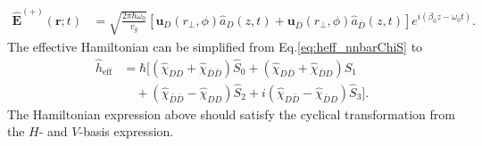 \documentclass[preprint,aps,pra,onecolumn,superscriptaddress]{revtex4-1} %
\def\br{\mathbf{r}}
\newcommand{\nn}{\nonumber}
\newcommand{\eff}{\text{eff}}
\begin{document}
\begin{appendix}
\begin{align}
\hat{\mathbf{E}}^{(+)}(\br;t) &=\sqrt{ \frac{2 \pi \hbar \omega_0}{ v_g} } \left[\mathbf{u}_D(r\!_\perp,\phi) \hat{a}_D(z,t)+\mathbf{u}_{\bar{D}}(r\!_\perp,\phi) \hat{a}_{\bar{D}}(z,t)  \right]e^{i (\beta_0 z- \omega_0 t)}.
\end{align}
The effective Hamiltonian can be simplified from Eq.\eqref{eq:heff_nnbarChiS} to 
\begin{align}
\hat{h}_\eff &= \hbar[(\hat{\chi}_{DD}+\hat{\chi}_{\bar{D}\bar{D}})\hat{S}_0 +(\hat{\chi}_{D\bar{D}}+\hat{\chi}_{\bar{D}D} )\hat{S}_1\nn\\
&\quad + (\hat{\chi}_{\bar{D}\bar{D}}-\hat{\chi}_{DD})\hat{S}_2 +i(\hat{\chi}_{D\bar{D}}-\hat{\chi}_{\bar{D}D} )\hat{S}_3].
\end{align}
The Hamiltonian expression above should satisfy the cyclical transformation from the $ H $- and $ V $-basis expression.


\end{appendix}
\end{document}
